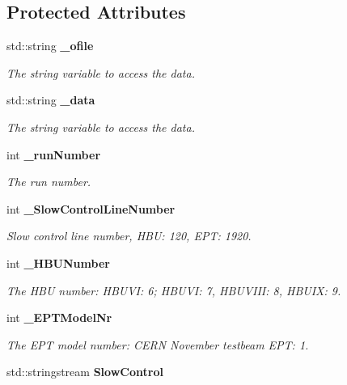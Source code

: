 \subsection*{Protected Attributes}
\begin{DoxyCompactItemize}
\item 
std::string {\bf \_\-ofile}
\begin{DoxyCompactList}\small\item\em The string variable to access the data. \item\end{DoxyCompactList}\item 
std::string {\bf \_\-data}\label{classmarlin_1_1LabviewConverter_a2a7a7963f225275d1b19989c356f4f9a}

\begin{DoxyCompactList}\small\item\em The string variable to access the data. \item\end{DoxyCompactList}\item 
int {\bf \_\-runNumber}\label{classmarlin_1_1LabviewConverter_aeefca366348efb5bf87b819ec8807132}

\begin{DoxyCompactList}\small\item\em The run number. \item\end{DoxyCompactList}\item 
int {\bf \_\-SlowControlLineNumber}\label{classmarlin_1_1LabviewConverter_ab280114ab31d4ff2bedfea28ec3a7fc8}

\begin{DoxyCompactList}\small\item\em Slow control line number, HBU: 120, EPT: 1920. \item\end{DoxyCompactList}\item 
int {\bf \_\-HBUNumber}
\begin{DoxyCompactList}\small\item\em The HBU number: HBUVI: 6; HBUVI: 7, HBUVIII: 8, HBUIX: 9. \item\end{DoxyCompactList}\item 
int {\bf \_\-EPTModelNr}\label{classmarlin_1_1LabviewConverter_a8559206de7459e3c8d92dd74be0ae5e2}

\begin{DoxyCompactList}\small\item\em The EPT model number: CERN November testbeam EPT: 1. \item\end{DoxyCompactList}\item 
std::stringstream {\bf SlowControl}\label{classmarlin_1_1LabviewConverter_a728e8504c1c11db843755f9d2f90df3b}


\end{DoxyCompactItemize}
